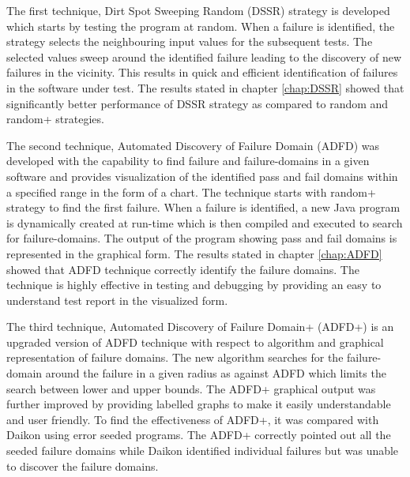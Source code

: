 


The first technique, Dirt Spot Sweeping Random (DSSR) strategy is developed which starts by testing the program at random. When a failure is identified, the strategy selects the neighbouring input values for the subsequent tests. The selected values sweep around the identified failure leading to the discovery of new failures in the vicinity. This results in quick and efficient identification of failures in the software under test. The results stated in chapter \ref{chap:DSSR} showed that significantly better performance of DSSR strategy as compared to random and random+ strategies.

The second technique, Automated Discovery of Failure Domain (ADFD) was developed with the capability to find failure and failure-domains in a given software and provides visualization of the identified pass and fail domains within a specified range in the form of a chart. The technique starts with random+ strategy to find the first failure. When a failure is identified, a new Java program is dynamically created at run-time which is then compiled and executed to search for failure-domains. The output of the program showing pass and fail domains is represented in the graphical form. The results stated in chapter \ref{chap:ADFD} showed that ADFD technique correctly identify the failure domains. The technique is highly effective in testing and debugging by providing an easy to understand test report in the visualized form. 

The third technique, Automated Discovery of Failure Domain+ (ADFD+) is an upgraded version of ADFD technique with respect to algorithm and graphical representation of failure domains. The new algorithm searches for the failure-domain around the failure in a given radius as against ADFD which limits the search between lower and upper bounds. The ADFD+ graphical output was further improved by providing labelled graphs to make it easily understandable and user friendly. To find the effectiveness of ADFD+, it was compared with Daikon using error seeded programs. The ADFD+ correctly pointed out all the seeded failure domains while Daikon identified individual failures but was unable to discover the failure domains. 


